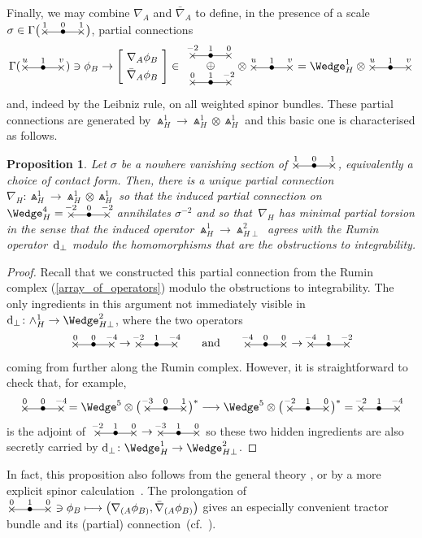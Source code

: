\documentclass[pdftex]{sigma}%
\numberwithin{equation}{section}
\newtheorem{prop}[Theorem]{Proposition}
 { \theoremstyle{definition}
\newtheorem{Definition}[Theorem]{Definition}
\newtheorem{Note}[Theorem]{Note}
\newtheorem{Example}[Theorem]{Example}
\newtheorem{Remark}[Theorem]{Remark} }
\newcommand{\xox}[3]{\begin{picture}(40,11)
\put(4,1.5){\makebox(0,0){$\times$}}
\put(20,1.5){\makebox(0,0){$\bullet$}}
\put(36,1.5){\makebox(0,0){$\times$}}
\put(4,1.5){\line(1,0){32}}
\put(4,8){\makebox(0,0){$\scriptstyle #1$}}
\put(20,8){\makebox(0,0){$\scriptstyle #2$}}
\put(36,8){\makebox(0,0){$\scriptstyle #3$}}
\end{picture}}
\begin{document}
Finally, we may combine $\nabla_A$ and $\bar\nabla_A$ to define, in the
presence of a scale $\sigma\in\Gamma\big(\xox{1}{0}{1}\big)$, partial connections
\[\Gamma(\xox{u}{1}{v})\ni\phi_B\to
\left[\!\begin{array}{c}\nabla_A\phi_B\\[3pt]
\bar\nabla_A\phi_B\end{array}\!\right]
\in\begin{array}{c}\xox{-2}{1}{0}\\[-2pt] \oplus\\[-1pt]
\xox{0}{1}{-2}\end{array}\!\!\otimes\xox{u}{1}{v}
=\Wedge_H^1\otimes\xox{u}{1}{v}\]
and, indeed by the Leibniz rule, on all weighted spinor bundles. These partial
connections are generated by $\Wedge_H^1\to\Wedge_H^1\otimes\Wedge_H^1$ and
this basic one is characterised as follows.

\begin{prop}\label{prop6}
Let $\sigma$ be a nowhere vanishing section of $\xox{1}{0}{1}$,
equivalently a choice of contact form. Then, there is a unique partial
connection $\nabla_H\colon \Wedge_H^1\to\Wedge_H^1\otimes\Wedge_H^1$ so that the
induced partial connection on $\Wedge_H^4=\xox{-2}{0}{-2}$ annihilates
$\sigma^{-2}$ and so that~$\nabla_H$ has minimal partial torsion in the sense
that the induced operator $\Wedge_H^1\to\Wedge_{H\perp}^2$ agrees with the
Rumin operator~${\rm d}_\perp$ modulo the homomorphisms that are the obstructions to
integrability.
\end{prop}

\begin{proof} Recall that we constructed this partial connection from the Rumin
complex (\ref{array_of_operators}) modulo the obstructions to integrability.
The only ingredients in this argument not immediately visible in
${\rm d}_\perp\colon \wedge_H^1\to\Wedge_{H\perp}^2$, where the two operators
\[\xox{0}{0}{-4}\to\xox{-2}{1}{-4}\qquad\mbox{and}\qquad
\xox{-4}{0}{0}\to\xox{-4}{1}{-2}\]
coming from further along the Rumin complex. However, it is straightforward to
check that, for example,
\[\xox{0}{0}{-4}=\Wedge^5\otimes\big(\,\xox{-3}{0}{1}\big)^*\longrightarrow
\Wedge^5\otimes\big(\,\xox{-2}{1}{0}\big)^*=\xox{-2}{1}{-4}\]
is the adjoint of $\;\xox{-2}{1}{0}\to\xox{-3}{1}{0}$ so these two hidden
ingredients are also secretly carried by
${\rm d}_\perp\colon \Wedge_H^1\to\Wedge_{H\perp}^2$.
\end{proof}

In fact, this proposition also follows from the general theory \cite{CS}, or by
a more explicit spinor calculation~\cite{Moy}. The prolongation of
$\xox{0}{1}{0}\ni\phi_B\longmapsto
\big(\nabla_{(A}\phi_{B)},\bar\nabla_{(A}\phi_{B)}\big)$ gives an especially convenient
tractor bundle and its (partial) connection~(cf.~\cite{CS,Moy}).
\end{document}
